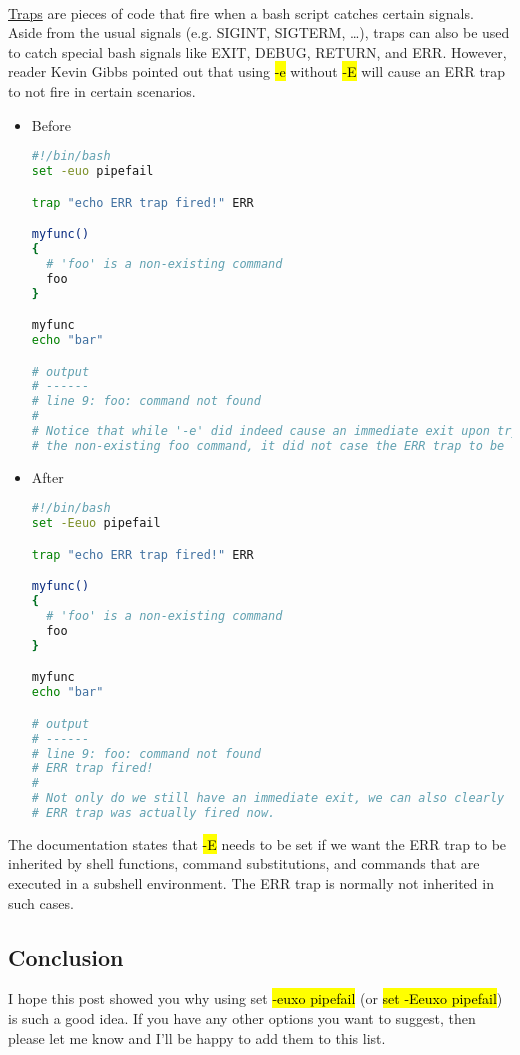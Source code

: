 \documentclass[a4paper]{article}
\begin{document}
\paragraph{}
\href{http://tldp.org/LDP/Bash-Beginners-Guide/html/sect_12_02.html}{Traps} are pieces of code that fire when a bash script catches certain signals. Aside from the usual signals (e.g. SIGINT, SIGTERM, …), traps can also be used to catch special bash signals like EXIT, DEBUG, RETURN, and ERR. However, reader Kevin Gibbs pointed out that using \hl{-e} without \hl{-E} will cause an ERR trap to not fire in certain scenarios.
\begin{itemize}
  \item Before
  \begin{lstlisting}[language=Bash]
#!/bin/bash
set -euo pipefail

trap "echo ERR trap fired!" ERR

myfunc()
{
  # 'foo' is a non-existing command
  foo
}

myfunc
echo "bar"

# output
# ------
# line 9: foo: command not found
#
# Notice that while '-e' did indeed cause an immediate exit upon trying to execute
# the non-existing foo command, it did not case the ERR trap to be fired.
  \end{lstlisting}
  \item After
  \begin{lstlisting}[language=Bash]
#!/bin/bash
set -Eeuo pipefail

trap "echo ERR trap fired!" ERR

myfunc()
{
  # 'foo' is a non-existing command
  foo
}

myfunc
echo "bar"

# output
# ------
# line 9: foo: command not found
# ERR trap fired!
#
# Not only do we still have an immediate exit, we can also clearly see that the
# ERR trap was actually fired now.
  \end{lstlisting}
\end{itemize}
The documentation states that \hl{-E} needs to be set if we want the ERR trap to be inherited by shell functions, command substitutions, and commands that are executed in a subshell environment. The ERR trap is normally not inherited in such cases.

\subsection{Conclusion}
I hope this post showed you why using set \hl{-euxo pipefail} (or \hl{set -Eeuxo pipefail}) is such a good idea. If you have any other options you want to suggest, then please let me know and I’ll be happy to add them to this list.
\end{document}
